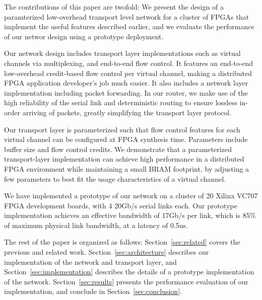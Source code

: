 The contributions of this paper are twofold: We present the design of a
paramterized low-overhead transport level network for a cluster of FPGAs that
implement the useful features described earlier, and we evaluate the performance
of our networ design using a prototype deployment.

Our network design includes transport layer implementations such as virtual
channels via multiplexing, and end-to-end flow control. It features an
end-to-end low-overhead credit-based flow control per virtual channel, making a
distributed FPGA application developer's job much easier.  It also includes a
network layer implementation including packet forwarding. In our router, we make
use of the high reliability of the serial link and deterministic routing to
ensure lossless in-order arriving of packets, greatly simplifying the transport
layer protocol.  

Our transport layer is parameterized such that flow control features for each
virtual channel can be configured at FPGA synthesis time. Parameters include
buffer size and flow control credits.  We demonstrate that a parameterized
transport-layer implementation can achieve high performance in a distributed
FPGA environment while maintaining a small BRAM footprint, by adjusting a few
parameters to best fit the usage characteristics of a virtual channel. 

We have implemented a prototype of our network on a cluster of 20 Xilinx VC707
FPGA development boards, with 4 20Gb/s serial links each. Our prototype
implementation achieves an effective bandwidth of 17Gb/s per link, which is 85\%
of maximum physical link bandwidth, at a latency of 0.5us.

The rest of the paper is organized as follows: Section~\ref{sec:related} covers
the previous and related work. Section~\ref{sec:architecture} describes our
implementation of the network and transport layer, and
Section~\ref{sec:implementation} describes the details of a prototype
implementation of the network. Section~\ref{sec:results}
presents the performance evaluation of our implementation, and conclude in
Section~\ref{sec:conclusion}.

